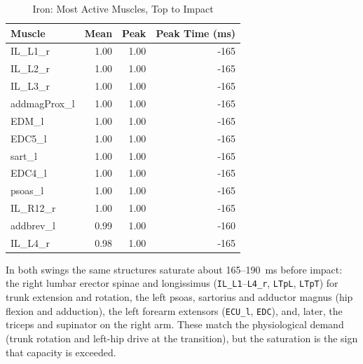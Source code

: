 \documentclass[11pt,a4paper]{article}
\begin{document}
\begin{table}[h]\centering\small
\caption{Iron: Most Active Muscles, Top to Impact}
\begin{tabular}{lrrr}\toprule Muscle & Mean & Peak & Peak Time (ms) \\\midrule
IL\_L1\_r & 1.00 & 1.00 & -165 \\
IL\_L2\_r & 1.00 & 1.00 & -165 \\
IL\_L3\_r & 1.00 & 1.00 & -165 \\
addmagProx\_l & 1.00 & 1.00 & -165 \\
EDM\_l & 1.00 & 1.00 & -165 \\
EDC5\_l & 1.00 & 1.00 & -165 \\
sart\_l & 1.00 & 1.00 & -165 \\
EDC4\_l & 1.00 & 1.00 & -165 \\
psoas\_l & 1.00 & 1.00 & -165 \\
IL\_R12\_r & 1.00 & 1.00 & -165 \\
addbrev\_l & 0.99 & 1.00 & -160 \\
IL\_L4\_r & 0.98 & 1.00 & -165 \\
\bottomrule\end{tabular}\end{table}
\noindent In both swings the same structures saturate about 165--190~ms before impact: the right lumbar erector spinae and longissimus (\texttt{IL\_L1}--\texttt{L4\_r}, \texttt{LTpL}, \texttt{LTpT}) for trunk extension and rotation, the left psoas, sartorius and adductor magnus (hip flexion and adduction), the left forearm extensors (\texttt{ECU\_l}, \texttt{EDC}), and, later, the triceps and supinator on the right arm. These match the physiological demand (trunk rotation and left-hip drive at the transition), but the saturation is the sign that capacity is exceeded.
\end{document}

